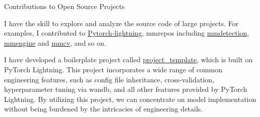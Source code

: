 \begin{cventries}
	\cventry
	{} %
	{Contributions to Open Source Projects} %
	{\hfill} %
	{} %
	{
		\vspace{-3.5mm}
		\begin{cvitems} %
			\item{I have the skill to explore and analyze the source code of large projects. For examples, I contributed to \href{https://github.com/Lightning-AI/lightning}{\textcolor{link}{Pytorch-lightning}}, mmrepos including \href{https://github.com/open-mmlab/mmdetection}{\textcolor{link}{mmdetection}}, \href{https://github.com/open-mmlab/mmengine}{\textcolor{link}{mmengine}} and \href{https://github.com/open-mmlab/mmcv}{\textcolor{link}{mmcv}}, and so on.}
			\item{I have developed a boilerplate project called \href{https://github.com/shenmishajing/project_template}{\textcolor{link}{project\_template}}, which is built on PyTorch Lightning. This project incorporates a wide range of common engineering features, such as config file inheritance, cross-validation, hyperparameter tuning via wandb, and all other features provided by PyTorch Lightning. By utilizing this project, we can concentrate on model implementation without being burdened by the intricacies of engineering details.}
		\end{cvitems}
	}
\end{cventries}
